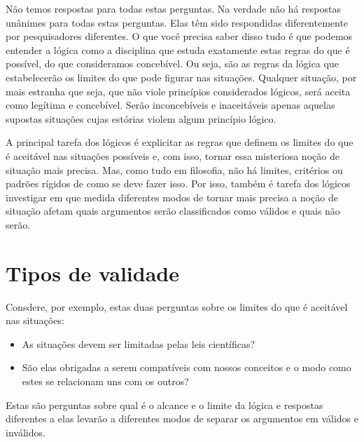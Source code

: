 Não temos respostas para todas estas perguntas.
Na verdade não há respostas unânimes para todas estas perguntas.
Elas têm sido respondidas diferentemente por pesquisadores diferentes.
O que você precisa saber disso tudo é que podemos entender a lógica como a disciplina que estuda exatamente estas regras do que é possível, do que consideramos concebível.
Ou seja, são as regras da lógica que estabelecerão os limites do que pode figurar nas situações.
Qualquer situação, por mais estranha que seja, que não viole princípios considerados lógicos, será aceita como legítima e concebível.
Serão inconcebíveis e inaceitáveis apenas aquelas supostas situações cujas estórias violem algum princípio lógico.


A principal tarefa dos lógicos é explicitar as regras que definem os limites do que é aceitável nas situações possíveis e, com isso, tornar essa misteriosa noção de situação mais precisa.
Mas, como tudo em filosofia, não há limites, critérios ou padrões rígidos de como se deve fazer isso.
Por isso, também é tarefa dos lógicos investigar em que medida diferentes modos de tornar mais precisa a noção de situação afetam quais argumentos serão classificados como válidos e quais não serão.

\section{Tipos de validade}
Consdere, por exemplo, estas duas perguntas sobre os limites do que é aceitável nas situações:
\begin{itemize}
	\item As situações devem ser limitadas pelas leis científicas?
	\item São elas obrigadas a serem compatíveis com nossos conceitos e o modo como estes se relacionam uns com os outros?
\end{itemize}
Estas são perguntas sobre qual é o alcance e o limite da lógica e respostas diferentes a elas  levarão a diferentes modos de separar os argumentos em válidos e inválidos.

